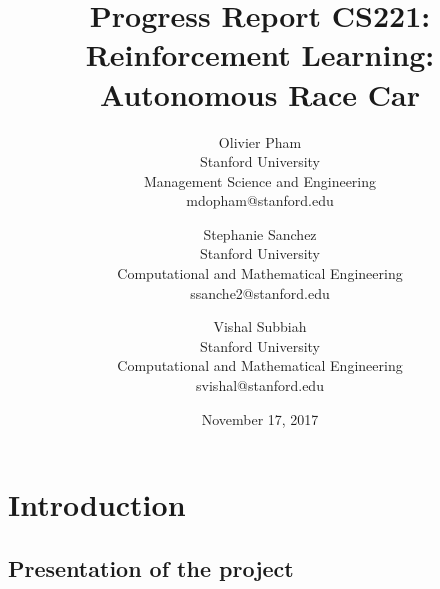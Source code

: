 \documentclass[10pt,twocolumn,letterpaper]{article}
\date{November 17, 2017}
\begin{document}

\title{{Progress Report CS221: Reinforcement Learning: Autonomous Race Car}}
\author{Olivier Pham\\
Stanford University\\
Management Science and Engineering\\
 {mdopham@stanford.edu}
\and
Stephanie Sanchez\\
Stanford University\\
Computational and Mathematical Engineering\\
{ ssanche2@stanford.edu}
\and
Vishal Subbiah\\
Stanford University\\
Computational and Mathematical Engineering\\
{svishal@stanford.edu}
}
\maketitle

  


\section{Introduction}

\subsection{Presentation of the project}

\end{document}
